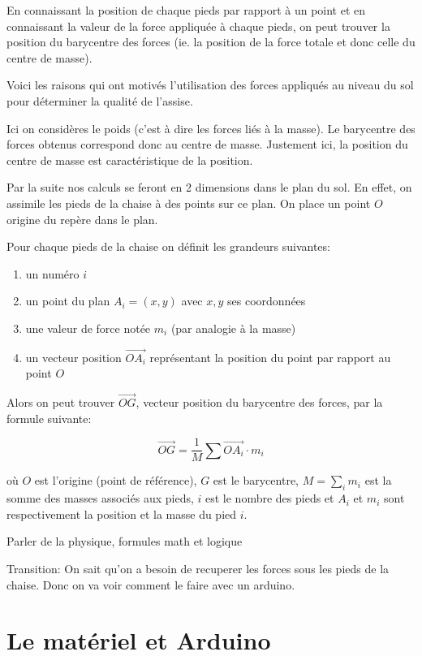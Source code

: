 \documentclass{polytech/polytech}
\begin{document}
En connaissant la position de chaque pieds par rapport à un point et en connaissant la valeur de la force appliquée à chaque pieds, on peut trouver la position du barycentre des forces (ie. la position de la force totale et donc celle du centre de masse). 

Voici les raisons qui ont motivés l'utilisation des forces appliqués au niveau du sol pour déterminer la qualité de l'assise.

Ici on considères le poids (c'est à dire les forces liés à la masse). Le barycentre des forces obtenus correspond donc au centre de masse. 
Justement ici, la position du centre de masse est caractéristique de la position.

Par la suite nos calculs se feront en 2 dimensions dans le plan du sol. En effet, on assimile les pieds de la chaise à des points sur ce plan. On place un point $O$ origine du repère dans le plan. 

Pour chaque pieds de la chaise on définit les grandeurs suivantes:

\begin{enumerate}
\item un numéro $i$
\item un point du plan $A_i=(x,y)$ avec $x,y$ ses coordonnées
\item une valeur de force notée $m_i$ (par analogie à la masse)
\item un vecteur position $\vec{OA_i}$ représentant la position du point par rapport au point $O$
\end{enumerate}

Alors on peut trouver $\vec{OG}$, vecteur position du barycentre des forces, par la formule suivante:


$$\vec{OG} = \frac{1}{M} \sum \vec{OA_i} \cdot m_i$$

où $O$ est l'origine (point de référence), $G$ est le barycentre, $M=\sum_i m_i$ est la somme des masses associés aux pieds, $i$ est le nombre des pieds et $A_i$ et $m_i$ sont respectivement la position et la masse du pied $i$.


Parler de la physique, formules math et logique

Transition: On sait qu'on a besoin de recuperer les forces sous les pieds de la chaise. Donc on va voir comment le faire avec un arduino.

\section{Le matériel et Arduino}
\label{chap:arduino}
\end{document}
